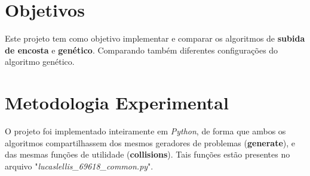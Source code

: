 \documentclass[conference]{IEEEtran}
\begin{document}
	
	\section{Objetivos}
	Este projeto tem como objetivo implementar e comparar os algoritmos de \textbf{subida de encosta} e \textbf{genético}.
	Comparando também diferentes configurações do algoritmo genético.
	\section{Metodologia Experimental}
	O projeto foi implementado inteiramente em \textit{Python}, de forma que ambos os algoritmos compartilhassem dos mesmos
	geradores de problemas (\textbf{generate}), e das mesmas funções de utilidade (\textbf{collisions}). Tais funções estão presentes no arquivo "\textit{lucaslellis\_69618\_common.py}".
\end{document}
